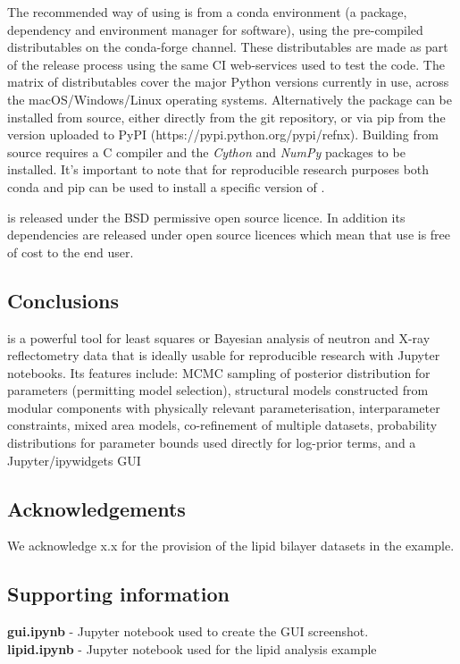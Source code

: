 \documentclass[12pt]{article}
\begin{document}
 The recommended way of using  is from a conda environment (a package, dependency and environment manager for software), using the pre-compiled distributables on the  conda-forge channel. These distributables are made as part of the release process using the same CI web-services used to test the code. The matrix of distributables cover the major Python versions currently in use, across the macOS/Windows/Linux operating systems. Alternatively the package can be installed from source, either directly from the git repository, or via pip from the version uploaded to PyPI (https://pypi.python.org/pypi/refnx). Building from source requires a C compiler and the \emph{Cython} and \emph{NumPy} packages to be installed. It's important to note that for reproducible research purposes both conda and pip can be used to install a specific version of .
 
 is released under the BSD permissive open source licence. In addition its dependencies are released under open source licences which mean that use is free of cost to the end user.

\subsection*{Conclusions}\label{conclusions}
 is a powerful tool for least squares or Bayesian analysis of neutron and X-ray reflectometry data that is ideally usable for reproducible research with Jupyter notebooks. Its features include: MCMC sampling of posterior distribution for parameters (permitting model selection), structural models constructed from modular components with physically relevant parameterisation, interparameter constraints, mixed area models, co-refinement of multiple datasets, probability distributions for parameter bounds used directly for log-prior terms, and a Jupyter/ipywidgets GUI

\subsection*{Acknowledgements}
We acknowledge x.x for the provision of the lipid bilayer datasets in the example.

\subsection*{Supporting information}
\textbf{gui.ipynb} - Jupyter notebook used to create the GUI screenshot.\\
\textbf{lipid.ipynb} - Jupyter notebook used for the lipid analysis example

{}

\end{document}

